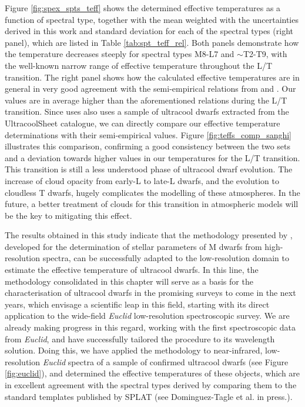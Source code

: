 Figure \ref{fig:spex_spts_teff} shows the determined effective temperatures as a function of spectral type, together with the mean weighted with the uncertainties derived in this work and standard deviation for each of the spectral types (right panel), which are listed in Table \ref{tab:spt_teff_rel}. Both panels demonstrate how the temperature decreases steeply for spectral types M8-L7 and $\sim$T2-T9, with the well-known narrow range of effective temperature throughout the L/T transition. The right panel shows how the calculated effective temperatures are in general in very good agreement with the semi-empirical relations from \citet{kirkpatrick2021} and \citet{sanghi2023}. Our values are in average higher than the aforementioned relations during the L/T transition. Since \citet{sanghi2023} uses also uses a sample of ultracool dwarfs extracted from the UltracoolSheet catalogue, we can directly compare our effective temperature determinations with their semi-empirical values. Figure \ref{fig:teffs_comp_sanghi} illustrates this comparison, confirming a good consistency between the two sets and a deviation towards higher values in our temperatures for the L/T transition. This transition is still a less understood phase of ultracool dwarf evolution. The increase of cloud opacity from early-L to late-L dwarfs, and the evolution to cloudless T dwarfs, hugely complicates the modelling of these atmospheres. In the future, a better treatment of clouds for this transition in atmospheric models will be the key to mitigating this effect.

The results obtained in this study indicate that the methodology presented by \citet{masbuitrago2024}, developed for the determination of stellar parameters of M dwarfs from high-resolution spectra, can be successfully adapted to the low-resolution domain to estimate the effective temperature of ultracool dwarfs. In this line, the methodology consolidated in this chapter will serve as a basis for the characterisation of ultracool dwarfs in the promising surveys to come in the next years, which envisage a scientific leap in this field, starting with its direct application to the wide-field \textit{Euclid} low-resolution spectroscopic survey. We are already making progress in this regard, working with the first spectroscopic data from \textit{Euclid}, and have successfully tailored the procedure to its wavelength solution. Doing this, we have applied the methodology to near-infrared, low-resolution \textit{Euclid} spectra of a sample of confirmed ultracool dwarfs (see Figure \ref{fig:euclid}), and determined the effective temperatures of these objects, which are in excellent agreement with the spectral types derived by comparing them to the standard templates published by SPLAT (see Dominguez-Tagle et al. in press.).

